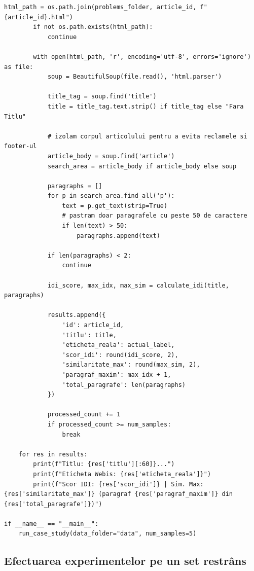 \documentclass[12pt, a4paper]{article}
\begin{document}
\begin{lstlisting}[label={lst:experiment_idi}, caption={Scriptul de preprocesare HTML si calcul al scorului IDI (\texttt{experiment\_idi.py})}]
        html_path = os.path.join(problems_folder, article_id, f"{article_id}.html")
        if not os.path.exists(html_path):
            continue
            
        with open(html_path, 'r', encoding='utf-8', errors='ignore') as file:
            soup = BeautifulSoup(file.read(), 'html.parser')
            
            title_tag = soup.find('title')
            title = title_tag.text.strip() if title_tag else "Fara Titlu"
            
            # izolam corpul articolului pentru a evita reclamele si footer-ul
            article_body = soup.find('article')
            search_area = article_body if article_body else soup
            
            paragraphs = []
            for p in search_area.find_all('p'):
                text = p.get_text(strip=True)
                # pastram doar paragrafele cu peste 50 de caractere
                if len(text) > 50:
                    paragraphs.append(text)
            
            if len(paragraphs) < 2:
                continue
                
            idi_score, max_idx, max_sim = calculate_idi(title, paragraphs)
            
            results.append({
                'id': article_id,
                'titlu': title,
                'eticheta_reala': actual_label,
                'scor_idi': round(idi_score, 2),
                'similaritate_max': round(max_sim, 2),
                'paragraf_maxim': max_idx + 1,
                'total_paragrafe': len(paragraphs)
            })
            
            processed_count += 1
            if processed_count >= num_samples:
                break

    for res in results:
        print(f"Titlu: {res['titlu'][:60]}...")
        print(f"Eticheta Webis: {res['eticheta_reala']}")
        print(f"Scor IDI: {res['scor_idi']} | Sim. Max: {res['similaritate_max']} (paragraf {res['paragraf_maxim']} din {res['total_paragrafe']})")

if __name__ == "__main__":
    run_case_study(data_folder="data", num_samples=5)
\end{lstlisting}

\subsection{Efectuarea experimentelor pe un set restrâns}
\end{document}
